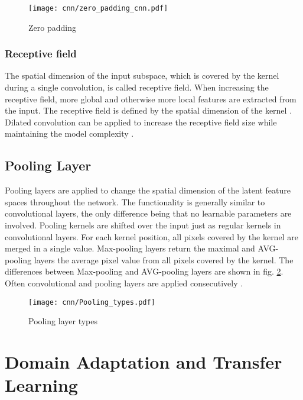 \begin{figure}[H]
  \centering
  \texttt{[image: cnn/zero\_padding\_cnn.pdf]}
  \caption {Zero padding}
  \label{fig:zero_padding_cnn}
\end{figure}

\subsubsection{Receptive field}
The spatial dimension of the input subspace, which is covered by the kernel during a single convolution, is called receptive field. When increasing the receptive field, more global and otherwise more local features are extracted from the input. The receptive field is defined by the spatial dimension of the kernel \cite{OShea2015}. Dilated convolution can be applied to increase the receptive field size while maintaining the model complexity \cite{Dai2017}. 

\subsection{Pooling Layer}
Pooling layers are applied to change the spatial dimension of the latent feature spaces throughout the network. The functionality is generally similar to convolutional layers, the only difference being that no learnable parameters are involved. Pooling kernels are shifted over the input just as regular kernels in convolutional layers. For each kernel position, all pixels covered by the kernel are merged in a single value. Max-pooling layers return the maximal and AVG-pooling layers the average pixel value from all pixels covered by the kernel. The differences between Max-pooling and AVG-pooling layers are shown in fig. \ref{fig:Pooling_types}. Often convolutional and pooling layers are applied consecutively \cite{OShea2015}.

\begin{figure}[H]
  \centering
  \texttt{[image: cnn/Pooling\_types.pdf]}
  \caption {Pooling layer types}
  \label{fig:Pooling_types}
\end{figure}

\section{Domain Adaptation and Transfer Learning}

